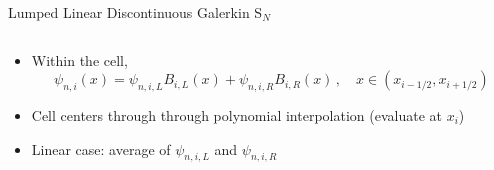 \documentclass[10pt]{beamer}
\newcommand{\SN}{S$_N$\xspace}
\begin{document}
\begin{frame}{Lumped Linear Discontinuous Galerkin \SN}
\begin{columns}
\begin{column}{1.06\textwidth}
\begin{itemize}
		\item 
		Within the cell, 
		\begin{equation*}
			\psi_{n,i}(x) = \psi_{n,i,L} B_{i,L}(x) + \psi_{n,i,R} B_{i,R}(x) \,, \quad x \in (x_{i-1/2},x_{i+1/2})
		\end{equation*}
		\item 
		Cell centers through through polynomial interpolation (evaluate at $x_i$) 

		\item 
		Linear case: average of $\psi_{n,i,L}$ and $\psi_{n,i,R}$ 

	\end{itemize}

	\end{column}
	\end{columns}

\end{frame}






% 		

\end{document}
